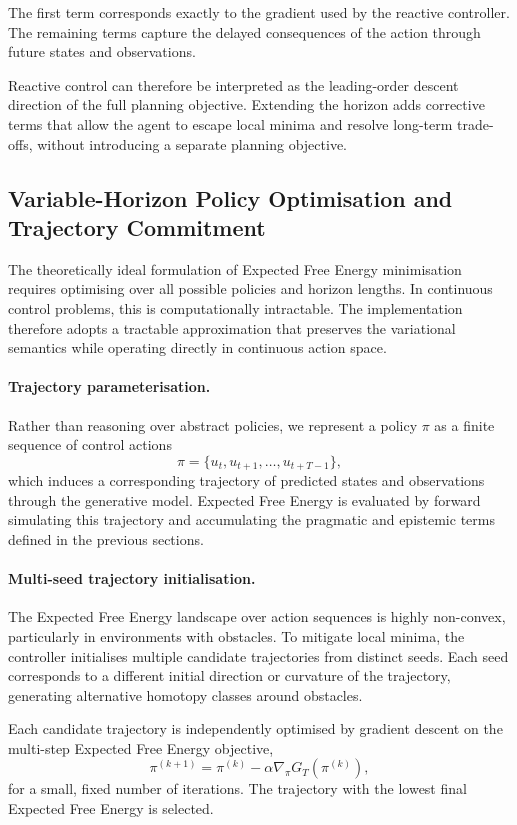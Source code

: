 \documentclass[a4paper, twoside]{article}
\begin{document}
The first term corresponds exactly to the gradient used by the reactive
controller. The remaining terms capture the delayed consequences of the action
through future states and observations.

Reactive control can therefore be interpreted as the leading-order descent
direction of the full planning objective. Extending the horizon adds corrective
terms that allow the agent to escape local minima and resolve long-term
trade-offs, without introducing a separate planning objective.

\subsection{Variable-Horizon Policy Optimisation and Trajectory Commitment}

The theoretically ideal formulation of Expected Free Energy minimisation requires
optimising over all possible policies and horizon lengths. In continuous control
problems, this is computationally intractable. The implementation therefore
adopts a tractable approximation that preserves the variational semantics while
operating directly in continuous action space.

\paragraph{Trajectory parameterisation.}
Rather than reasoning over abstract policies, we represent a policy $\pi$ as a
finite sequence of control actions
\[
\pi = \{u_t, u_{t+1}, \ldots, u_{t+T-1}\},
\]
which induces a corresponding trajectory of predicted states and observations
through the generative model. Expected Free Energy is evaluated by forward
simulating this trajectory and accumulating the pragmatic and epistemic terms
defined in the previous sections.

\paragraph{Multi-seed trajectory initialisation.}
The Expected Free Energy landscape over action sequences is highly non-convex,
particularly in environments with obstacles. To mitigate local minima, the
controller initialises multiple candidate trajectories from distinct seeds.
Each seed corresponds to a different initial direction or curvature of the
trajectory, generating alternative homotopy classes around obstacles.

Each candidate trajectory is independently optimised by gradient descent on the
multi-step Expected Free Energy objective,
\[
\pi^{(k+1)} = \pi^{(k)} - \alpha \nabla_\pi G_T(\pi^{(k)}),
\]
for a small, fixed number of iterations. The trajectory with the lowest final
Expected Free Energy is selected.
\end{document}
